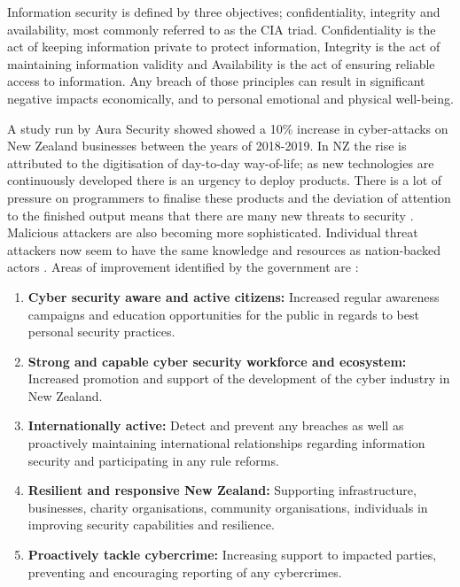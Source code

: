 Information security is defined by three objectives; confidentiality, integrity and availability, most commonly referred to as the CIA triad. Confidentiality is the act of keeping information private to protect information, Integrity is the act of maintaining information validity and Availability is the act of ensuring reliable access to information.  Any breach of those principles can result in significant negative impacts economically, and to personal emotional and physical well-being. 
\newline
\par A study run by Aura Security showed \cite{aura} showed a 10\% increase in cyber-attacks on New Zealand businesses between the years of 2018-2019. In NZ the rise is attributed to the digitisation of day-to-day way-of-life; as new technologies are continuously developed there is an urgency to deploy products. There is a lot of pressure on programmers to finalise these products and the deviation of attention to the finished output means that there are many new threats to security \cite{securitystrat}. Malicious attackers are also becoming more sophisticated. Individual threat attackers now seem to have the same knowledge and resources as nation-backed actors \cite{securitystrat}.
\newline
\newline
Areas of improvement identified by the government are \cite{securitystrat}:

\begin{enumerate}
    \item \textbf{Cyber security aware and active citizens:} Increased regular awareness campaigns and education opportunities for the public in regards to best personal security practices. 
    \item \textbf{Strong and capable cyber security workforce and ecosystem:} Increased promotion and support of the development of the cyber industry in New Zealand.
    \item \textbf{Internationally active:} Detect and prevent any breaches as well as proactively maintaining international relationships regarding information security and participating in any rule reforms. 
    \item \textbf{Resilient and responsive New Zealand:} Supporting infrastructure, businesses, charity organisations, community organisations, individuals in improving security capabilities and resilience.
    \item \textbf{Proactively tackle cybercrime:} Increasing support to impacted parties,  preventing and encouraging reporting of any cybercrimes. 
\end{enumerate}

